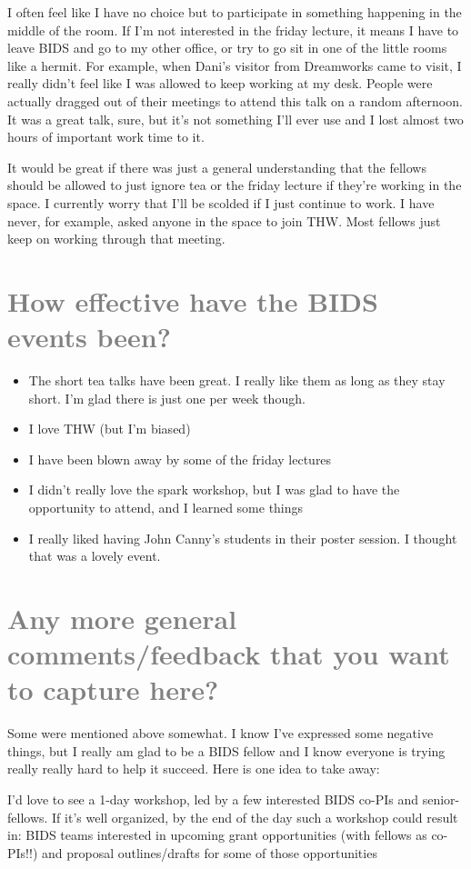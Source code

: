 \documentclass[a4paper, 10pt]{article}
\begin{document}
I often feel like I have no choice but to participate in something happening in
the middle of the room. If I'm not interested in the friday lecture, it means I
have to leave BIDS and go to my other office, or try to go sit in one of the
little rooms like a hermit. For example, when Dani’s visitor from Dreamworks
came to visit, I really didn't feel like I was allowed to keep working at my
desk. People were actually dragged out of their meetings to attend this talk on
a random afternoon. It was a great talk, sure, but it’s not something I’ll ever
use and I lost almost two hours of important work time to it.

It would be great if there was just a general understanding that the fellows
should be allowed to just ignore tea or the friday lecture if they’re working
in the space. I currently worry that I’ll be scolded if I just continue to
work. I have never, for example, asked anyone in the space to join THW. Most
fellows just keep on working through that meeting.

\section{\textcolor{gray}{How effective have the BIDS events been?}}

\begin{itemize}
\item The short tea talks have been great. I really like them as long as they
stay short. I'm glad there is just one per week though.
\item I love THW (but I'm biased)
\item I have been blown away by some of the friday lectures
\item I didn't really love the spark workshop, but I was glad to have the opportunity to attend, and I learned some things
\item I really liked having John Canny's students in their poster session. I thought that was a lovely event.
\end{itemize}


\section{\textcolor{gray}{Any more general comments/feedback that you want to
capture here?}}

Some were mentioned above somewhat. I know I've expressed some negative things,
but I really am glad to be a BIDS fellow and I know everyone is trying really
really hard to help it succeed. Here is one idea to take away:

I'd love to see a 1-day workshop, led by a few interested BIDS co-PIs and
senior-fellows. If it's well organized, by the end of the day such a workshop
could result in:
BIDS teams interested in upcoming grant opportunities (with fellows as co-PIs!!)
and proposal outlines/drafts for some of those opportunities
\end{document}

